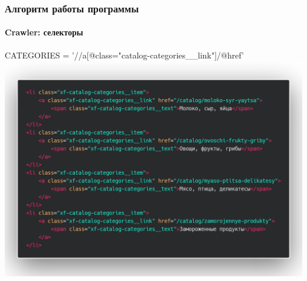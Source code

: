 \documentclass{beamer}
\begin{document}
\begin{frame}
    \frametitle{Алгоритм работы программы}
    \framesubtitle{Crawler: селекторы}
    \begin{center}
        CATEGORIES = '//a[@class="catalog-categories\_\_link"]/@href'
        \includegraphics[width=0.9\columnwidth]{code.png}
    \end{center}
\end{frame}
\end{document}
